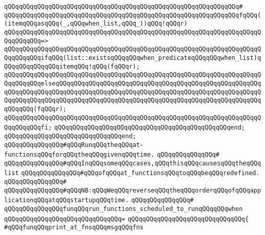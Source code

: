 \verb|qQQqqQQqqQQqqQQqqQQqqQQqqQQqqQQqqQQqqQQqqQQqqQQqqQQqqQQqqQQqqQQq#|\newline
\verb|qQQqqQQqqQQqqQQqqQQqqQQqqQQqqQQqqQQqqQQqqQQqqQQqqQQqqQQqqQQqqQQqfqQQq((itemqQQqasqQQq(_,qQQqwhen_list,qQQq_))qQQq!qQQqr)|\newline
\verb|qQQqqQQqqQQqqQQqqQQqqQQqqQQqqQQqqQQqqQQqqQQqqQQqqQQqqQQqqQQqqQQqqQQqqQQqqQQqqQQq=>|\newline
\verb|qQQqqQQqqQQqqQQqqQQqqQQqqQQqqQQqqQQqqQQqqQQqqQQqqQQqqQQqqQQqqQQqqQQqqQQqqQQqqQQqifqQQq(list::existsqQQqqQQqwhen_predicateqQQqqQQqwhen_list)qQQqqQQqqQQqqQQqitemqQQq!qQQq(fqQQqr);|\newline
\verb|qQQqqQQqqQQqqQQqqQQqqQQqqQQqqQQqqQQqqQQqqQQqqQQqqQQqqQQqqQQqqQQqqQQqqQQqqQQqqQQqelseqQQqqQQqqQQqqQQqqQQqqQQqqQQqqQQqqQQqqQQqqQQqqQQqqQQqqQQqqQQqqQQqqQQqqQQqqQQqqQQqqQQqqQQqqQQqqQQqqQQqqQQqqQQqqQQqqQQqqQQqqQQqqQQqqQQqqQQqqQQqqQQqqQQqqQQqqQQqqQQqqQQqqQQqqQQqqQQqqQQqqQQqqQQqqQQqqQQqqQQqqQQq(fqQQqr);|\newline
\verb|qQQqqQQqqQQqqQQqqQQqqQQqqQQqqQQqqQQqqQQqqQQqqQQqqQQqqQQqqQQqqQQqqQQqqQQqqQQqqQQqfi;|\newline
\verb|qQQqqQQqqQQqqQQqqQQqqQQqqQQqqQQqqQQqqQQqqQQqqQQqend;|\newline
\verb|qQQqqQQqqQQqqQQqqQQqqQQqqQQqqQQqend;|\newline
\newline
\newline
\verb|qQQqqQQqqQQqqQQq#qQQqRunqQQqtheqQQqat-functionsqQQqforqQQqtheqQQqgivenqQQqtime.|\newline
\verb|qQQqqQQqqQQqqQQq#|\newline
\verb|qQQqqQQqqQQqqQQq#qQQqInqQQqsomeqQQqcases,qQQqthisqQQqcausesqQQqtheqQQqlist|\newline
\verb|qQQqqQQqqQQqqQQq#qQQqofqQQqat_functionsqQQqtoqQQqbeqQQqredefined.|\newline
\verb|qQQqqQQqqQQqqQQq#|\newline
\verb|qQQqqQQqqQQqqQQq#qQQqNB:qQQqWeqQQqreverseqQQqtheqQQqorderqQQqofqQQqapplicationqQQqatqQQqstartupqQQqtime.|\newline
\verb|qQQqqQQqqQQqqQQq#|\newline
\verb|qQQqqQQqqQQqqQQqfunqQQqrun_functions_scheduled_to_runqQQqqQQqwhen|\newline
\verb|qQQqqQQqqQQqqQQqqQQqqQQqqQQqqQQq=|\newline
\verb|qQQqqQQqqQQqqQQqqQQqqQQqqQQqqQQq{|\newline
\verb|#qQQqfunqQQqprint_at_fnsqQQqmsgqQQqfns|\newline
